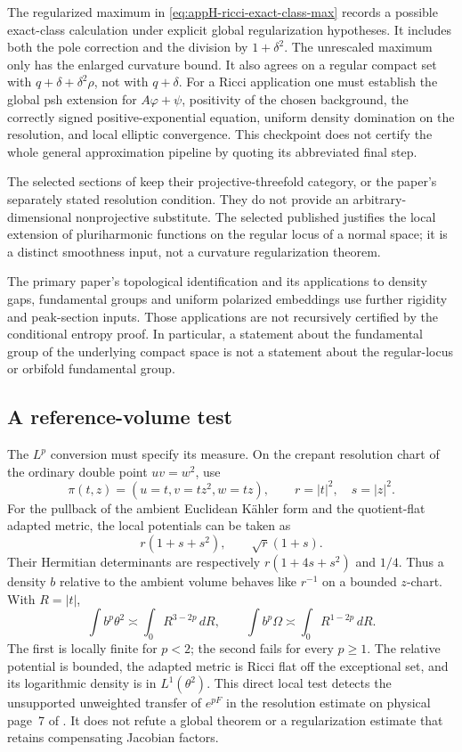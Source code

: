 The regularized maximum in
\eqref{eq:appH-ricci-exact-class-max} records a possible
exact-class calculation under explicit global regularization
hypotheses. It includes both the pole correction and the
division by \(1+\delta^2\). The unrescaled maximum only
has the enlarged curvature bound. It also agrees on a
regular compact set with \(q+\delta+\delta^2\rho\),
not with \(q+\delta\). For a Ricci application one must
establish the global psh extension for \(A\varphi+\psi\),
positivity of the chosen background, the correctly signed
positive-exponential equation, uniform density domination
on the resolution, and local elliptic convergence.
This checkpoint does not certify the whole general
approximation pipeline by quoting its abbreviated final step.

The selected sections of \cite{FGS25RCDThreefoldV1} keep
their projective-threefold category, or the paper's separately
stated resolution condition. They do not provide an
arbitrary-dimensional nonprojective substitute. The selected
published \cite{Vajaitu01EmbeddablePublished} justifies the
local extension of pluriharmonic functions on the regular
locus of a normal space; it is a distinct smoothness input,
not a curvature regularization theorem.

The primary paper's topological identification and its
applications to density gaps, fundamental groups and uniform
polarized embeddings use further rigidity and peak-section
inputs. Those applications are not recursively certified
by the conditional entropy proof. In particular, a
statement about the fundamental group of the underlying
compact space is not a statement about the regular-locus
or orbifold fundamental group.

\subsection{A reference-volume test}

The \(L^p\) conversion must specify its measure.
On the crepant resolution chart of the ordinary double
point \(uv=w^2\), use
\[
 \pi(t,z)=(u=t,v=tz^2,w=tz),\qquad
 r=|t|^2,\quad s=|z|^2.
\]
For the pullback of the ambient Euclidean K\"ahler form
and the quotient-flat adapted metric, the local potentials
can be taken as
\[
 r(1+s+s^2),\qquad \sqrt r(1+s).
\]
Their Hermitian determinants are respectively
\(r(1+4s+s^2)\) and \(1/4\). Thus a density
\(b\) relative to the ambient volume behaves like \(r^{-1}\)
on a bounded \(z\)-chart. With \(R=|t|\),
\[
 \int b^p\theta^2\asymp\int_0 R^{3-2p}\,dR,
 \qquad
 \int b^p\Omega\asymp\int_0 R^{1-2p}\,dR.
\]
The first is locally finite for \(p<2\); the second fails
for every \(p\geq1\). The relative potential is bounded,
the adapted metric is Ricci flat off the exceptional set,
and its logarithmic density is in \(L^1(\theta^2)\).
This direct local test detects the unsupported unweighted
transfer of \(e^{pF}\) in the resolution estimate on
physical page~7 of \cite{CCHSTT25CurrentsV1}.
It does not refute a global theorem or a regularization
estimate that retains compensating Jacobian factors.

